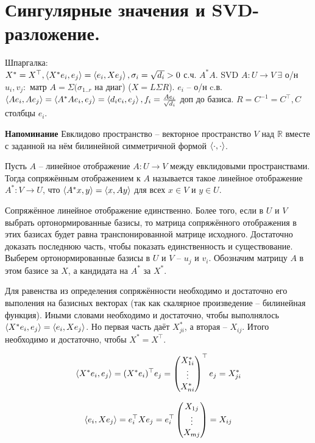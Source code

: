 \section{
Сингулярные значения и SVD-разложение.
}

Шпаргалка:\\
$X^* = X^{\top}, \left\langle X^*e_i, e_j\right\rangle = \left\langle e_i, Xe_j\right\rangle, \sigma_i = \sqrt{d_i} > 0$ с.ч. $A^*A$. SVD $A \colon U \to V \ \exists$ о/н $u_i, v_j \colon$ матр $A = \Sigma(\sigma_{1..r}$ на диаг) ($X = L\Sigma R$). $e_i$ -- о/н c.в. $\left\langle Ae_i, Ae_j\right\rangle = \left\langle A^*Ae_i, e_j\right\rangle = \left\langle d_ie_i, e_j\right\rangle, f_i = \frac{Ae_i}{\sqrt{d_i}}$ доп до базиса. $R = C^{-1} = C^{\top}, C$ столбцы $e_i$.

{\bf Напоминание} Евклидово пространство -- векторное пространство $V$ над $\mathbb{R}$ вместе с заданной на нём билинейной симметричной формой $\left\langle \cdot, \cdot\right\rangle$.

\dfn Пусть $A$ -- линейное отображение $A\colon U \to V$ между евклидовыми пространствами. Тогда сопряжённым отображением к $A$ называется такое линейное отображение $A^{*}\colon V \to U$, что $\left\langle A^*x,y\right\rangle = \left\langle x,Ay\right\rangle$ для всех $x\in V$ и $y \in U$.
\edfn

\thrm Сопряжённое линейное отображение единственно. Более того, если в $U$ и $V$ выбрать ортонормированные базисы, то матрица сопряжённого отображения в этих базисах будет равна транспонированной матрице исходного.
\proof Достаточно доказать последнюю часть, чтобы показать единственность и существование. Выберем ортонормированные базисы в $U$ и $V$ -- $u_j$ и $v_i$. Обозначим матрицу $A$ в этом базисе за $X$, а кандидата на $A^*$ за $X^*$.

Для равенства из определения сопряжённости необходимо и достаточно его выполения на базисных векторах (так как скалярное произведение -- билинейная функция). Иными словами необходимо и достаточно, чтобы выполнялось $\left\langle X^{*}e_i,e_j\right\rangle=\left\langle e_i,Xe_j\right\rangle$. Но первая часть даёт $X^{*}_{ji}$, а вторая -- $X_{ij}$. Итого необходимо и достаточно, чтобы $X^{*}=X^{\top}$.

$$\left\langle X^{*}e_i,e_j\right\rangle=(X^*e_i)^{\top}e_j = \begin{pmatrix} X^*_{1i}\\
 \vdots\\
 X^*_{ni} \end{pmatrix}^{\top}e_j = X^*_{ji}$$
 
 $$\left\langle e_i,Xe_j\right\rangle=e_i^{\top}Xe_j = e_i^{\top}\begin{pmatrix} X_{1j}\\
 \vdots\\
 X_{mj} \end{pmatrix} = X_{ij}$$

